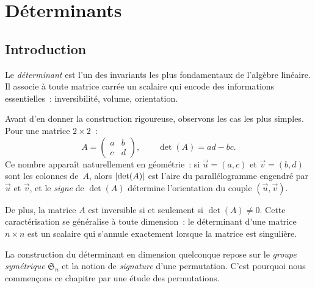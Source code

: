 
\chapter{Déterminants}\label{ch:determinants}

\section*{Introduction}

Le \emph{déterminant} est l'un des invariants les plus
fondamentaux de l'algèbre linéaire. Il associe à toute matrice carrée un
scalaire qui encode des informations essentielles~: inversibilité,
volume, orientation.

\medskip

Avant d'en donner la construction rigoureuse, observons les cas les plus
simples. Pour une matrice $2\times 2$~:
\[
  A=\begin{pmatrix}a&b\\c&d\end{pmatrix},\qquad
  \det(A)=ad-bc.
\]
Ce nombre apparaît naturellement en géométrie~: si $\vec{u}=(a,c)$ et
$\vec{v}=(b,d)$ sont les colonnes de~$A$, alors $\lvert\det(A)\rvert$ est
l'aire du parallélogramme engendré par $\vec{u}$ et $\vec{v}$, et le
\emph{signe} de $\det(A)$ détermine l'orientation du couple $(\vec{u},\vec{v})$.

\medskip

De plus, la matrice $A$ est inversible si et seulement si $\det(A)\neq 0$.
Cette caractérisation se généralise à toute dimension~: le déterminant
d'une matrice $n\times n$ est un scalaire qui s'annule exactement lorsque
la matrice est singulière.

\medskip

La construction du déterminant en dimension quelconque repose sur le
\emph{groupe symétrique} $\mathfrak{S}_n$ et la
notion de \emph{signature} d'une
permutation. C'est pourquoi nous commençons ce chapitre par une étude
des permutations.

